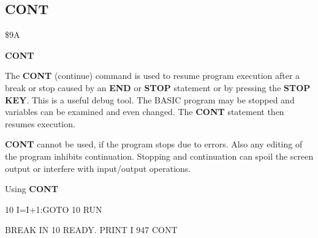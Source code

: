 
\newpage
\subsection{CONT}
\begin{description}[leftmargin=3cm,style=nextline]
\item [Token:] \$9A
\item [Format:] {\bf CONT}
\item [Usage:] The {\bf CONT} (continue) command is used to resume
               program execution after a break or stop caused by
               an {\bf END} or {\bf STOP} statement or by pressing
               the {\bf STOP KEY}.
               This is a useful debug tool. The BASIC program may be stopped
               and variables can be examined and even changed.
               The {\bf CONT} statement then resumes execution.
\item [Remarks:] {\bf CONT} cannot be used, if the program stops
               due to errors. Also any editing of the program
               inhibits continuation. Stopping and continuation
               can spoil the screen output or interfere with
               input/output operations.
\item [Example:] Using {\bf CONT}
\begin{screenoutput}
10 I=I+1:GOTO 10
RUN

BREAK IN 10
READY.
PRINT I
 947
CONT
\end{screenoutput}
\end{description}


\newpage
